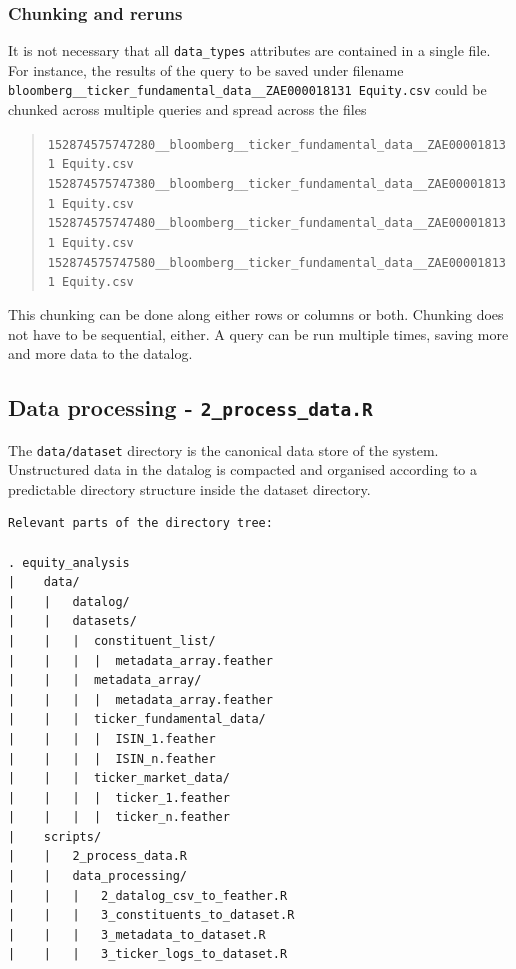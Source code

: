 \documentclass[11pt,preprint, authoryear]{elsarticle}
\numberwithin{equation}{section}
\numberwithin{figure}{section}
\numberwithin{table}{section}
\begin{document}
\subsubsection{Chunking and reruns}\label{chunking-and-reruns}

It is not necessary that all \texttt{data\_types} attributes are
contained in a single file. For instance, the results of the query to be
saved under filename
\texttt{bloomberg\_\_ticker\_fundamental\_data\_\_ZAE000018131\ Equity.csv}
could be chunked across multiple queries and spread across the files

\begin{quote}
\texttt{152874575747280\_\_bloomberg\_\_ticker\_fundamental\_data\_\_ZAE000018131\ Equity.csv}\\
\texttt{152874575747380\_\_bloomberg\_\_ticker\_fundamental\_data\_\_ZAE000018131\ Equity.csv}\\
\texttt{152874575747480\_\_bloomberg\_\_ticker\_fundamental\_data\_\_ZAE000018131\ Equity.csv}\\
\texttt{152874575747580\_\_bloomberg\_\_ticker\_fundamental\_data\_\_ZAE000018131\ Equity.csv}
\end{quote}

This chunking can be done along either rows or columns or both. Chunking
does not have to be sequential, either. A query can be run multiple
times, saving more and more data to the datalog.

\newpage

\subsection{\texorpdfstring{Data processing -
\texttt{2\_process\_data.R}}{Data processing - 2\_process\_data.R}}\label{data-processing---2_process_data.r}

The \texttt{data/dataset} directory is the canonical data store of the
system. Unstructured data in the datalog is compacted and organised
according to a predictable directory structure inside the dataset
directory.

\begin{verbatim}
Relevant parts of the directory tree: 

. equity_analysis
|    data/
|    |   datalog/
|    |   datasets/
|    |   |  constituent_list/
|    |   |  |  metadata_array.feather
|    |   |  metadata_array/
|    |   |  |  metadata_array.feather
|    |   |  ticker_fundamental_data/
|    |   |  |  ISIN_1.feather
|    |   |  |  ISIN_n.feather
|    |   |  ticker_market_data/
|    |   |  |  ticker_1.feather
|    |   |  |  ticker_n.feather
|    scripts/
|    |   2_process_data.R
|    |   data_processing/
|    |   |   2_datalog_csv_to_feather.R
|    |   |   3_constituents_to_dataset.R
|    |   |   3_metadata_to_dataset.R
|    |   |   3_ticker_logs_to_dataset.R
\end{verbatim}
\end{document}
